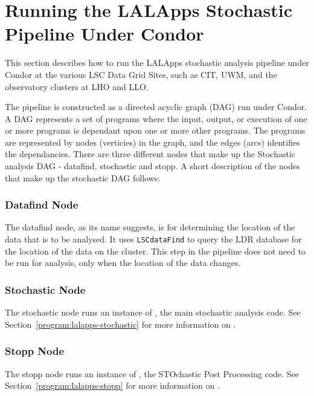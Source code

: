 
\section{Running the LALApps Stochastic Pipeline Under Condor}

This section describes how to run the LALApps stochastic analysis
pipeline under Condor at the various LSC Data Grid Sites, such as CIT,
UWM, and the observatory clusters at LHO and LLO.

The pipeline is constructed as a directed acyclic graph (DAG) run under
Condor. A DAG represents a set of programs where the input, output, or
execution of one or more programs is dependant upon one or more other
programs. The programs are represented by nodes (verticies) in the
graph, and the edges (arcs) identifies the dependancies. There are three
different nodes that make up the Stochastic analysis DAG - datafind,
stochastic and stopp. A short description of the nodes that make up the
stochastic DAG follows:

\subsubsection{Datafind Node}

The datafind node, as its name suggests, is for determining the location
of the data that is to be analysed. It uses \texttt{LSCdataFind} to
query the LDR database for the location of the data on the cluster. This
step in the pipeline does not need to be run for analysis, only when the
location of the data changes.

\subsubsection{Stochastic Node}

The stochastic node runs an instance of , the
main stochastic analysis code. See
Section~\ref{program:lalapps-stochastic} for more information on
.

\subsubsection{Stopp Node}

The stopp node runs an instance of , the STOchastic
Post Processing code. See Section~\ref{program:lalapps-stopp} for more
information on .

